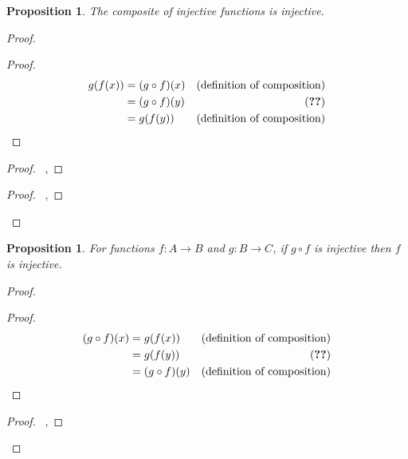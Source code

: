 \documentclass{book}
\let\qed\relax
\newtheorem{prop}[ax]{Proposition}
\theoremstyle{definition}
\begin{document}
\begin{prop}
\label{prop:comp_inj}
The composite of injective functions is injective.
\end{prop}

\begin{proof}
\pf
{}
\begin{proof}
	\pf
	\begin{align*}
		g(f(x)) & = (g \circ f)(x) & (\text{definition of composition}) \\
		& = (g \circ f)(y) & (\text{\stepref{7}}) \\
		& = g(f(y))& (\text{definition of composition})
	\end{align*}
\end{proof}
\begin{proof}
	\pf\ , 
\end{proof}
\begin{proof}
	\pf\ , 
\end{proof}
\qed
\end{proof}

\begin{prop}
For functions $f : A \rightarrow B$ and $g : B \rightarrow C$, if $g \circ f$ is injective then $f$ is injective.
\end{prop}

\begin{proof}
\pf
{}
\begin{proof}
	\pf
	\begin{align*}
		(g \circ f)(x) & = g(f(x)) & (\text{definition of composition}) \\
		& = g(f(y)) & (\text{\stepref{6}}) \\
		& = (g \circ f)(y) & (\text{definition of composition})
	\end{align*}
\end{proof}
\begin{proof}
	\pf\ , 
\end{proof}
\qed
\end{proof}
\end{document}
